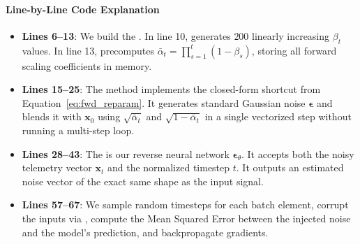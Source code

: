 \paragraph{Line-by-Line Code Explanation}
\begin{itemize}
    \item \textbf{Lines 6--13}: We build the . In line 10,  generates $200$ linearly increasing $\beta_t$ values. In line 13,  precomputes $\bar{\alpha}_t = \prod_{s=1}^t (1 - \beta_s)$, storing all forward scaling coefficients in memory.
    \item \textbf{Lines 15--25}: The  method implements the closed-form shortcut from Equation~\eqref{eq:fwd_reparam}. It generates standard Gaussian noise $\boldsymbol{\epsilon}$ and blends it with $\mathbf{x}_0$ using $\sqrt{\bar{\alpha}_t}$ and $\sqrt{1 - \bar{\alpha}_t}$ in a single vectorized step without running a multi-step loop.
    \item \textbf{Lines 28--43}: The  is our reverse neural network $\boldsymbol{\epsilon}_\theta$. It accepts both the noisy telemetry vector $\mathbf{x}_t$ and the normalized timestep $t$. It outputs an estimated noise vector of the exact same shape as the input signal.
    \item \textbf{Lines 57--67}: We sample random timesteps for each batch element, corrupt the inputs via , compute the Mean Squared Error between the injected noise and the model's prediction, and backpropagate gradients.
\end{itemize}

